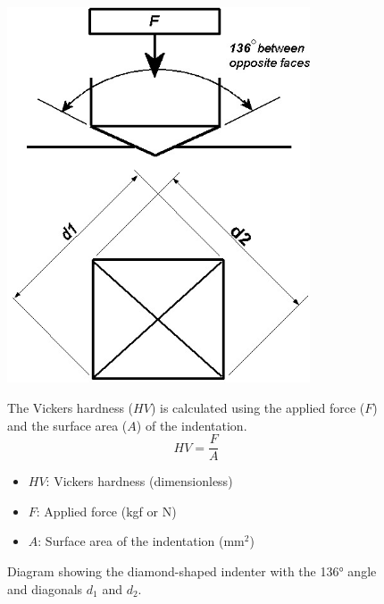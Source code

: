\documentclass{article}
\begin{document}
    \begin{figure}[H]
        \centering
        \begin{minipage}{0.45\textwidth}\centering
            \vspace{1em}\includegraphics[width=0.8\textwidth]{figures/3537580_orig-0000.jpg}
            \caption{Diagram showing the diamond-shaped indenter with the 136° angle and diagonals \(d_1\) and \(d_2\).}
            \label{fig:vickers-diagram}
        \end{minipage}\hfill
        \begin{minipage}{0.51\textwidth}
            The Vickers hardness (\(HV\)) is calculated using the applied force (\(F\)) and the surface area (\(A\)) of the indentation. 
            \begin{equation}
                    HV = \frac{F}{A}
            \end{equation}
            \begin{itemize}[itemsep=-1mm]
                \item \(HV\): Vickers hardness (dimensionless)
                \item \(F\): Applied force (kgf or N)
                \item \(A\): Surface area of the indentation (mm\(^2\))
                

\end{itemize}
\end{minipage}
\end{figure}
\end{document}
